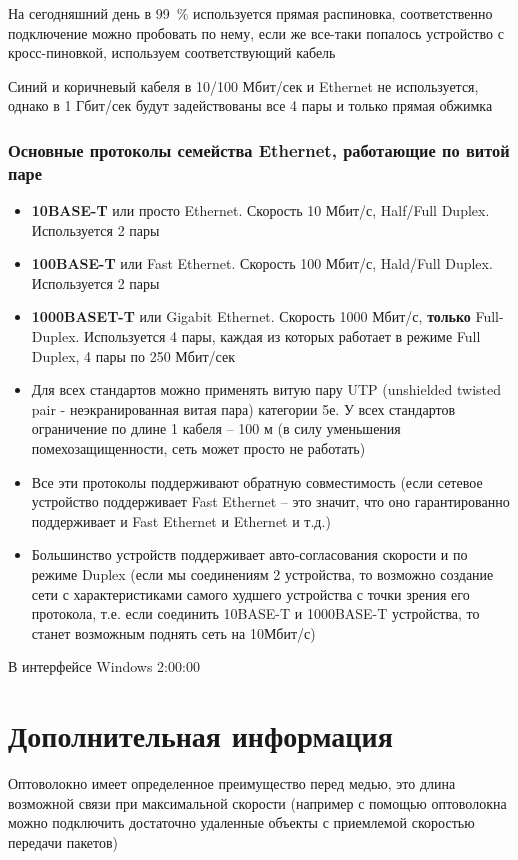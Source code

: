 \documentclass[a4paper]{article}
\begin{document}
На сегодняшний день в 99~\% используется прямая распиновка, соответственно подключение можно пробовать по нему, если же все-таки попалось устройство с кросс-пиновкой, используем соответствующий кабель

Синий и коричневый кабеля в 10/100 Мбит/сек и Ethernet не используется, однако в 1 Гбит/сек будут задействованы все 4 пары и только прямая обжимка

\subsubsection{Основные протоколы семейства Ethernet, работающие по витой паре}
\begin{itemize}
	\item \textbf{10BASE-T} или просто Ethernet. Скорость 10 Мбит/с, Half/Full Duplex. Используется 2 пары
	\item \textbf{100BASE-T} или Fast Ethernet. Скорость 100 Мбит/с, Hald/Full Duplex. Используется 2 пары
	\item \textbf{1000BASET-T} или Gigabit Ethernet. Скорость 1000 Мбит/с, \textbf{только} Full-Duplex. Используется 4 пары, каждая из которых работает в режиме Full Duplex, 4 пары по 250 Мбит/сек
	\item Для всех стандартов можно применять витую пару UTP (unshielded twisted pair - неэкранированная витая пара) категории 5е. У всех стандартов ограничение по длине 1 кабеля -- 100 м (в силу уменьшения помехозащищенности, сеть может просто не работать)
	\item Все эти протоколы поддерживают обратную совместимость (если сетевое устройство поддерживает Fast Ethernet -- это значит, что оно гарантированно поддерживает и Fast Ethernet и Ethernet и т.д.)
	\item Большинство устройств поддерживает авто-согласования скорости и по режиме Duplex (если мы соединениям 2 устройства, то возможно создание сети с характеристиками самого худшего устройства с точки зрения его протокола, т.е. если соединить 10BASE-T и 1000BASE-T устройства, то станет возможным поднять сеть на 10Мбит/с)
\end{itemize}

В интерфейсе Windows
2:00:00






\newpage
\section{Дополнительная информация}
Оптоволокно имеет определенное преимущество перед медью, это длина возможной связи при максимальной скорости (например с помощью оптоволокна можно подключить достаточно удаленные объекты с приемлемой скоростью передачи пакетов)
\end{document}
